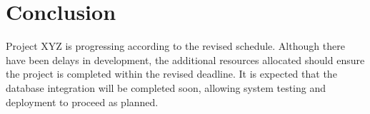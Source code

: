 \documentclass[12pt]{article}
\begin{document}
\section*{Conclusion}
Project XYZ is progressing according to the revised schedule. Although there have been delays in development, the additional resources allocated should ensure the project is completed within the revised deadline. It is expected that the database integration will be completed soon, allowing system testing and deployment to proceed as planned.
\end{document}
